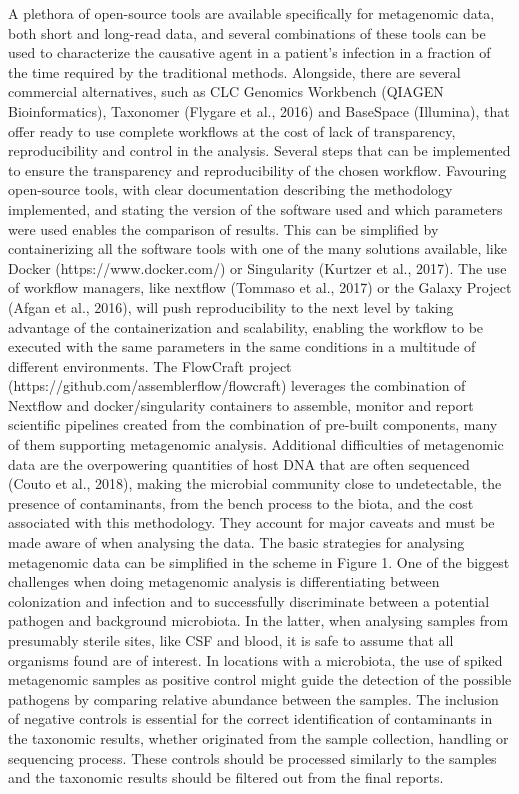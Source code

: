 A plethora of open-source tools are available specifically for metagenomic data, both short and long-read data, and several combinations of these tools can be used to characterize the causative agent in a patient's infection in a fraction of the time required by the traditional methods. Alongside, there are several commercial alternatives, such as CLC Genomics Workbench (QIAGEN Bioinformatics), Taxonomer (Flygare et al., 2016) and BaseSpace (Illumina), that offer ready to use complete workflows at the cost of lack of transparency, reproducibility and control in the analysis.
Several steps that can be implemented to ensure the transparency and reproducibility of the chosen workflow. Favouring open-source tools, with clear documentation describing the methodology implemented, and stating the version of the software used and which parameters were used enables the comparison of results. This can be simplified by containerizing all the software tools with one of the many solutions available, like Docker (https://www.docker.com/) or Singularity (Kurtzer et al., 2017). The use of workflow managers, like nextflow (Tommaso et al., 2017) or the Galaxy Project (Afgan et al., 2016), will push reproducibility to the next level by taking advantage of the containerization and scalability, enabling the workflow to be executed with the same parameters in the same conditions in a multitude of different environments. The FlowCraft project (https://github.com/assemblerflow/flowcraft) leverages the combination of Nextflow and docker/singularity containers to assemble, monitor and report scientific pipelines created from the combination of pre-built components, many of them supporting metagenomic analysis.
Additional difficulties of metagenomic data are the overpowering quantities of host DNA that are often sequenced (Couto et al., 2018), making the microbial community close to undetectable, the presence of contaminants, from the bench process to the biota, and the cost associated with this methodology. They account for major caveats and must be made aware of when analysing the data.
The basic strategies for analysing metagenomic data can be simplified in the scheme in Figure 1. One of the biggest challenges when doing metagenomic analysis is differentiating between colonization and infection and to successfully discriminate between a potential pathogen and background microbiota. In the latter, when analysing samples from presumably sterile sites, like CSF and blood, it is safe to assume that all organisms found are of interest. In locations with a microbiota, the use of spiked metagenomic samples as positive control might guide the detection of the possible pathogens by comparing relative abundance between the samples. The inclusion of negative controls is essential for the correct identification of contaminants in the taxonomic results, whether originated from the sample collection, handling or sequencing process. These controls should be processed similarly to the samples and the taxonomic results should be filtered out from the final reports. 

